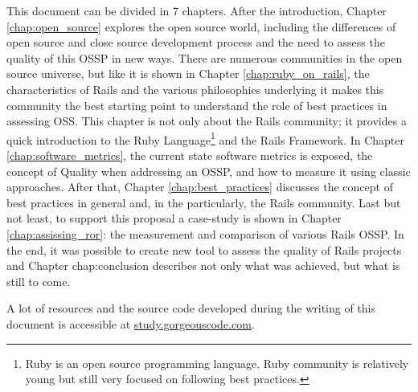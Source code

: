 This document can be divided in 7 chapters.
After the introduction, Chapter \ref{chap:open_source} explores the open source world,
including the differences of open source and close source development process
and the need to assess the quality of this OSSP in new ways.
There are numerous communities in the open source universe, but like it is shown in Chapter \ref{chap:ruby_on_rails},
the characteristics of Rails and the various philosophies underlying it 
makes this community the best starting point to understand the role of best practices in assessing OSS.
This chapter is not only about the Rails community; it provides a quick introduction to the \textsf{Ruby Language}\footnote{
  Ruby is an open source programming language. Ruby community is relatively young but still very focused on following best practices.
} and the Rails Framework.
In Chapter \ref{chap:software_metrics}, the current state software metrics is exposed,
the concept of Quality when addressing an OSSP, and how to measure it using classic approaches.
After that, Chapter \ref{chap:best_practices} discusses the concept of best practices in general and, 
in the particularly, the Rails community.
Last but not least, to support this proposal a case-study is shown in Chapter \ref{chap:assissing_ror}: 
the measurement and comparison of various Rails OSSP.
In the end, it was possible to create new tool to assess the quality of Rails projects and 
Chapter {chap:conclusion} describes not only what was achieved, but what is still to come.

A lot of resources and the source code developed during the writing of this document is accessible at 
\url{study.gorgeouscode.com}.
